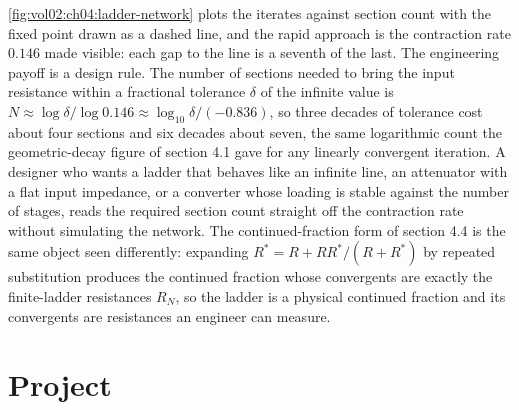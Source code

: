 \autoref{fig:vol02:ch04:ladder-network} plots the iterates against
section count with the fixed point drawn as a dashed line, and the rapid
approach is the contraction rate $0.146$ made visible: each gap to the
line is a seventh of the last. The engineering payoff is a design rule.
The number of sections needed to bring the input resistance within a
fractional tolerance $\delta$ of the infinite value is
$N \approx \log\delta / \log 0.146 \approx \log_{10}\delta / (-0.836)$, so
three decades of tolerance cost about four sections and six decades about
seven, the same logarithmic count the geometric-decay figure of section
4.1 gave for any linearly convergent iteration. A designer who wants a
ladder that behaves like an infinite line, an attenuator with a flat
input impedance, or a converter whose loading is stable against the
number of stages, reads the required section count straight off the
contraction rate without simulating the network. The continued-fraction
form of section 4.4 is the same object seen differently: expanding
$R^{*} = R + R R^{*}/(R + R^{*})$ by repeated substitution produces the
continued fraction whose convergents are exactly the finite-ladder
resistances $R_{N}$, so the ladder is a physical continued fraction and
its convergents are resistances an engineer can measure.

\section{Project}

